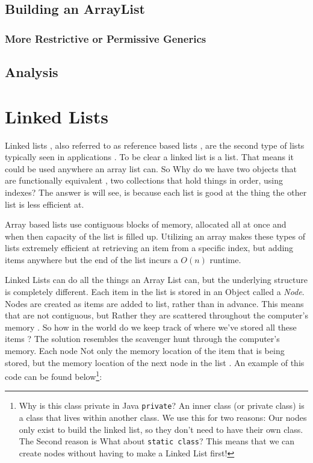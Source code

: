\documentclass[10pt,a4paper]{book}
\begin{document}
\section{Building an ArrayList}
\label{buildingArraylist}

\subsection{More Restrictive or Permissive Generics}

\section{Analysis}
\chapter{Linked Lists}
Linked lists , also referred to as reference based lists , are the second type of lists typically seen in applications . To be clear a linked list is a list. That means it could be used anywhere an array list can.   So Why do we have two objects that are functionally equivalent , two collections that hold things in order, using indexes?  The answer is will see, is because each list is good at the thing the other list is less efficient at.


Array based lists use contiguous blocks of memory, allocated all at once and when then capacity of the list is filled up.  Utilizing an array makes these types of lists extremely efficient at retrieving an item from a specific index, but adding items anywhere but the end of the list incurs a $O(n)$ runtime.



Linked Lists can do all the things an Array List can, but the underlying structure is completely different.  
Each item in the list is stored in an Object called a \textit{Node}.  Nodes are created as items are added to list, rather than in advance.  This means that are not contiguous, but Rather they are scattered throughout the computer's memory . So how in the world do we keep track of where we've stored all these items ? The solution resembles the scavenger hunt through the computer's memory.  Each node Not only the memory location of the item that is being stored, but the memory location of the next node in the list . An example of this code can be found below\footnote{Why is this class private in Java \texttt{private}? An inner class  (or private class) is a class that lives within another class.  We use this for two reasons:  Our nodes only exist to build the linked list, so they don't need to have their own class.  The Second reason is   What about \texttt{static class}? This means that we can create nodes without having to make a Linked List first! }: %
\end{document}
